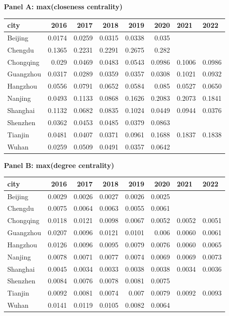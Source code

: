 \textbf{Panel A: max(closeness centrality)}\\
\begin{tabular}{lrrrrrll}
\hline
 city      &   2016 &   2017 &   2018 &   2019 &   2020 & 2021   & 2022   \\
\hline
 Beijing   & 0.0174 & 0.0259 & 0.0315 & 0.0338 & 0.035  &        &        \\
 Chengdu   & 0.1365 & 0.2231 & 0.2291 & 0.2675 & 0.282  &        &        \\
 Chongqing & 0.029  & 0.0469 & 0.0483 & 0.0543 & 0.0986 & 0.1006 & 0.0986 \\
 Guangzhou & 0.0317 & 0.0289 & 0.0359 & 0.0357 & 0.0308 & 0.1021 & 0.0932 \\
 Hangzhou  & 0.0556 & 0.0791 & 0.0652 & 0.0584 & 0.085  & 0.0527 & 0.0650 \\
 Nanjing   & 0.0493 & 0.1133 & 0.0868 & 0.1626 & 0.2083 & 0.2073 & 0.1841 \\
 Shanghai  & 0.1132 & 0.0682 & 0.0835 & 0.1024 & 0.0449 & 0.0944 & 0.0376 \\
 Shenzhen  & 0.0362 & 0.0453 & 0.0485 & 0.0379 & 0.0863 &        &        \\
 Tianjin   & 0.0481 & 0.0407 & 0.0371 & 0.0961 & 0.1688 & 0.1837 & 0.1838 \\
 Wuhan     & 0.0259 & 0.0509 & 0.0491 & 0.0357 & 0.0642 &        &        \\
\hline
\end{tabular}

\textbf{Panel B: max(degree centrality)}\\
\begin{tabular}{lrrrrrll}
\hline
 city      &   2016 &   2017 &   2018 &   2019 &   2020 & 2021   & 2022   \\
\hline
 Beijing   & 0.0029 & 0.0026 & 0.0027 & 0.0026 & 0.0025 &        &        \\
 Chengdu   & 0.0075 & 0.0064 & 0.0063 & 0.0055 & 0.0061 &        &        \\
 Chongqing & 0.0118 & 0.0121 & 0.0098 & 0.0067 & 0.0052 & 0.0052 & 0.0051 \\
 Guangzhou & 0.0207 & 0.0096 & 0.0121 & 0.0101 & 0.006  & 0.0060 & 0.0061 \\
 Hangzhou  & 0.0126 & 0.0096 & 0.0095 & 0.0079 & 0.0076 & 0.0060 & 0.0065 \\
 Nanjing   & 0.0078 & 0.0071 & 0.0077 & 0.0074 & 0.0069 & 0.0069 & 0.0073 \\
 Shanghai  & 0.0045 & 0.0034 & 0.0033 & 0.0038 & 0.0038 & 0.0034 & 0.0036 \\
 Shenzhen  & 0.0084 & 0.0076 & 0.0078 & 0.0081 & 0.0075 &        &        \\
 Tianjin   & 0.0092 & 0.0081 & 0.0074 & 0.007  & 0.0079 & 0.0092 & 0.0093 \\
 Wuhan     & 0.0141 & 0.0119 & 0.0105 & 0.0082 & 0.0064 &        &        \\
\hline
\end{tabular}

